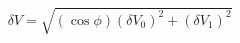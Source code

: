 \begin{equation}
\label{eq:delta_V_Malus}
\delta V = \sqrt{ \left(\cos{\phi}\right)(\delta V_0)^2 + (\delta V_1)^2}
\end{equation}